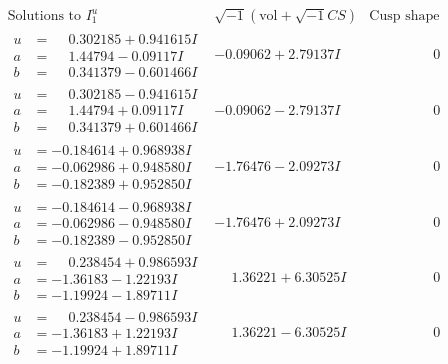 \documentclass[1p]{elsarticle_modified}
\theoremstyle{definition}
\newcommand{\I}{\sqrt{-1}}
\begin{document}
$$\begin{array}{c|c|c}  
\text{Solutions to }I^u_{1}& \I (\text{vol} + \sqrt{-1}CS) & \text{Cusp shape}\\
 \hline 
\begin{aligned}
u &= \phantom{-}0.302185 + 0.941615 I \\
a &= \phantom{-}1.44794 - 0.09117 I \\
b &= \phantom{-}0.341379 - 0.601466 I\end{aligned}
 & -0.09062 + 2.79137 I & \phantom{-0.000000 } 0 \\ \hline\begin{aligned}
u &= \phantom{-}0.302185 - 0.941615 I \\
a &= \phantom{-}1.44794 + 0.09117 I \\
b &= \phantom{-}0.341379 + 0.601466 I\end{aligned}
 & -0.09062 - 2.79137 I & \phantom{-0.000000 } 0 \\ \hline\begin{aligned}
u &= -0.184614 + 0.968938 I \\
a &= -0.062986 + 0.948580 I \\
b &= -0.182389 + 0.952850 I\end{aligned}
 & -1.76476 - 2.09273 I & \phantom{-0.000000 } 0 \\ \hline\begin{aligned}
u &= -0.184614 - 0.968938 I \\
a &= -0.062986 - 0.948580 I \\
b &= -0.182389 - 0.952850 I\end{aligned}
 & -1.76476 + 2.09273 I & \phantom{-0.000000 } 0 \\ \hline\begin{aligned}
u &= \phantom{-}0.238454 + 0.986593 I \\
a &= -1.36183 - 1.22193 I \\
b &= -1.19924 - 1.89711 I\end{aligned}
 & \phantom{-}1.36221 + 6.30525 I & \phantom{-0.000000 } 0 \\ \hline\begin{aligned}
u &= \phantom{-}0.238454 - 0.986593 I \\
a &= -1.36183 + 1.22193 I \\
b &= -1.19924 + 1.89711 I\end{aligned}
 & \phantom{-}1.36221 - 6.30525 I & \phantom{-0.000000 } 0 \\ \hline\begin{aligned}

\end{aligned}
\end{array}$$
\end{document}
